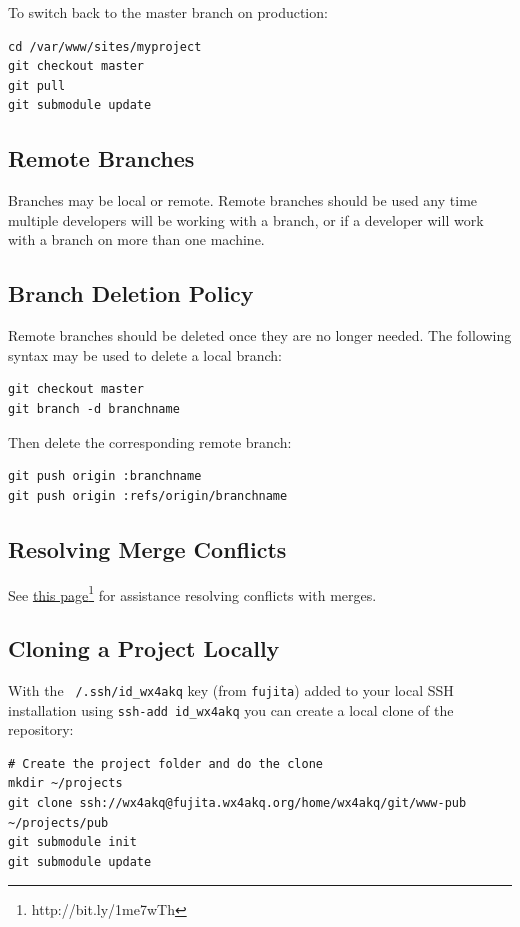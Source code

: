 \documentclass[pdflatex,letterpaper,twoside,12pt]{book}
\begin{document}
To switch back to the master branch on production:

\begin{lstlisting}
cd /var/www/sites/myproject
git checkout master
git pull
git submodule update
\end{lstlisting}

\subsection{Remote Branches}

Branches may be local or remote.  Remote branches should be used any time multiple developers will be working with a branch, or if a developer will work with a branch on more than one machine.

\subsection{Branch Deletion Policy}

Remote branches should be deleted once they are no longer needed.  The following syntax may be used to delete a local branch:

\begin{lstlisting}
git checkout master
git branch -d branchname
\end{lstlisting}

Then delete the corresponding remote branch:

\begin{lstlisting}
git push origin :branchname
git push origin :refs/origin/branchname
\end{lstlisting}

\subsection{Resolving Merge Conflicts}

See \href{http://bit.ly/1me7wTh}{this page}\footnote{http://bit.ly/1me7wTh} for assistance resolving conflicts with merges.

\subsection{Cloning a Project Locally}

With the \texttt{~/.ssh/id\_wx4akq} key (from \texttt{fujita}) added to your local SSH installation using \lstinline!ssh-add id_wx4akq! you can create a local clone of the repository:

\begin{lstlisting}
# Create the project folder and do the clone
mkdir ~/projects
git clone ssh://wx4akq@fujita.wx4akq.org/home/wx4akq/git/www-pub ~/projects/pub
git submodule init
git submodule update
\end{lstlisting}
\end{document}
